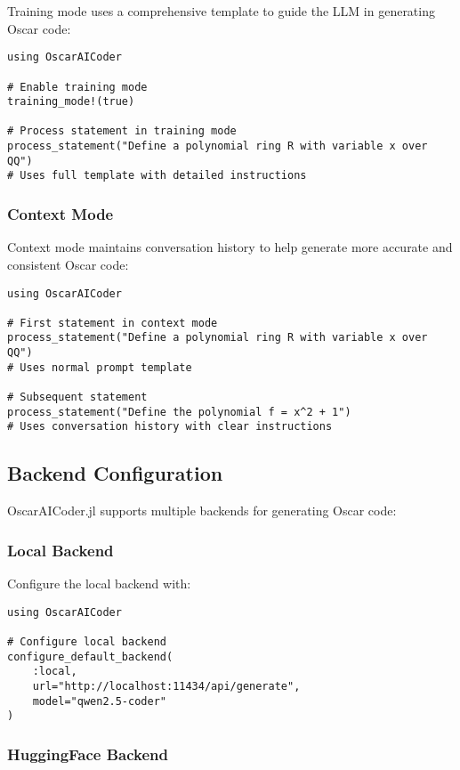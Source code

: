 \documentclass[11pt,a4paper]{article}
\begin{document}
Training mode uses a comprehensive template to guide the LLM in generating Oscar code:

\begin{lstlisting}
using OscarAICoder

# Enable training mode
training_mode!(true)

# Process statement in training mode
process_statement("Define a polynomial ring R with variable x over QQ")
# Uses full template with detailed instructions
\end{lstlisting}

\subsubsection{Context Mode}

Context mode maintains conversation history to help generate more accurate and consistent Oscar code:

\begin{lstlisting}
using OscarAICoder

# First statement in context mode
process_statement("Define a polynomial ring R with variable x over QQ")
# Uses normal prompt template

# Subsequent statement
process_statement("Define the polynomial f = x^2 + 1")
# Uses conversation history with clear instructions
\end{lstlisting}

\subsection{Backend Configuration}

OscarAICoder.jl supports multiple backends for generating Oscar code:

\subsubsection{Local Backend}

Configure the local backend with:

\begin{lstlisting}
using OscarAICoder

# Configure local backend
configure_default_backend(
    :local,
    url="http://localhost:11434/api/generate",
    model="qwen2.5-coder"
)
\end{lstlisting}

\subsubsection{HuggingFace Backend}
\end{document}
